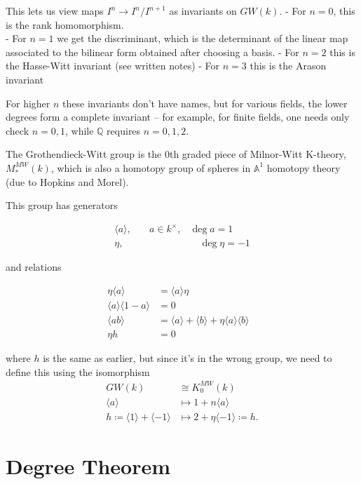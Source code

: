 \documentclass[11pt]{scrreprt}
\theoremstyle{definition}
\newcommand{\QQ}[0]{{\mathbb{Q}}}
\newcommand{\Af}[0]{{\mathbb{A}}}
\newcommand{\generators}[1]{\langle{#1}\rangle}
\newcommand{\definedas}[0]{\coloneqq}
\begin{document}
This lets us view maps \(I^n \to I^n/I^{n+1}\) as invariants on
\(GW(k)\). - For \(n=0\), this is the rank homomorphism.\\
- For \(n=1\) we get the discriminant, which is the determinant of the
linear map associated to the bilinear form obtained after choosing a
basis. - For \(n=2\) this is the Hasse-Witt invariant (see written
notes) - For \(n=3\) this is the Arason invariant

For higher \(n\) these invariants don't have names, but for various
fields, the lower degrees form a complete invariant -- for example, for
finite fields, one needs only check \(n=0,1\), while \(\QQ\) requires
\(n=0,1,2\).

The Grothendieck-Witt group is the 0th graded piece of Milnor-Witt
K-theory, \(M_*^{MW}(k)\), which is also a homotopy group of spheres in
\(\Af^1\) homotopy theory (due to Hopkins and Morel).

This group has generators

\begin{align*}
\generators{a}, &\quad a\in k^\times, &\deg a = 1\\
\eta, & & \quad\deg \eta = -1
\end{align*}

and relations

\begin{align*}
\eta \generators{a} &= \generators{a} \eta\\
\generators{a}\generators{1-a} &= 0&\\
\generators{ab} &= \generators{a} + \generators{b} + \eta \generators{a}\generators{b}\\
\eta h &= 0
\end{align*}

where \(h\) is the same as earlier, but since it's in the wrong group,
we need to define this using the isomorphism \begin{align*}
G W ( k ) &\cong K _ { 0 } ^ { MW } ( k ) \\
\generators{a} &\mapsto 1 + n \generators{a}\\
h\definedas \generators{1} + \generators{-1} &\mapsto 2 + \eta\generators{-1}\definedas h.
\end{align*}

\hypertarget{degree-theorem}{%
\section{Degree Theorem}\label{degree-theorem}}
\end{document}
